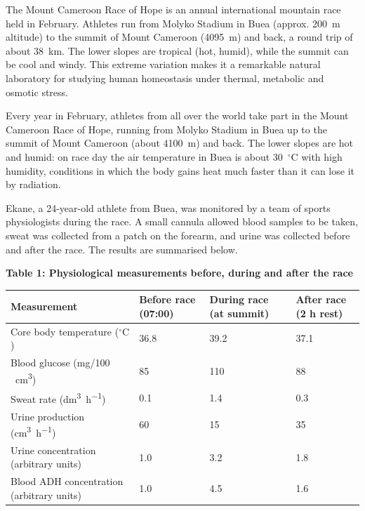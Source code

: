 \documentclass[11pt]{article}
\newcommand{\cle}[1]{{\popxbold\color{popdark}#1}}
\newcounter{popsec}
\newcounter{popsub}
\newcommand{\courssub}[1]{%
  \stepcounter{popsub}%
  \par\vspace{9pt}\noindent{\popxbold\fontsize{11.5}{13}\selectfont\color{popink}{\color{poporange}\thepopsec.\thepopsub}\hspace{6pt}#1}\par\nopagebreak\vspace{4pt}
}
\begin{document}
\begin{savaistu}
The \cle{Mount Cameroon Race of Hope} is an annual international mountain race held in February. Athletes run from Molyko Stadium in Buea (approx. \SI{200}{m} altitude) to the summit of Mount Cameroon (\SI{4095}{m}) and back, a round trip of about \SI{38}{km}. The lower slopes are tropical (hot, humid), while the summit can be cool and windy. This extreme variation makes it a remarkable natural laboratory for studying human homeostasis under thermal, metabolic and osmotic stress.
\end{savaistu}

\courssub{Situation}

\begin{experience}
Every year in February, athletes from all over the world take part in the \cle{Mount Cameroon Race of Hope}, running from Molyko Stadium in Buea up to the summit of Mount Cameroon (about \SI{4100}{m}) and back. The lower slopes are hot and humid: on race day the air temperature in Buea is about \SI{30}{\ensuremath{{}^{\circ}\mathrm{C}}} with high humidity, conditions in which the body gains heat much faster than it can lose it by radiation.

Ekane, a 24-year-old athlete from Buea, was monitored by a team of sports physiologists during the race. A small cannula allowed blood samples to be taken, sweat was collected from a patch on the forearm, and urine was collected before and after the race. The results are summarised below.

\textbf{Table 1: Physiological measurements before, during and after the race}

\begin{center}
\begin{tabularx}{\linewidth}{|l|X|X|X|}
\hline
\rowcolor{popblueL} \textbf{Measurement} & \textbf{Before race (07:00)} & \textbf{During race (at summit)} & \textbf{After race (2 h rest)} \\
\hline
Core body temperature (\si{\ensuremath{{}^{\circ}\mathrm{C}}}) & 36.8 & 39.2 & 37.1 \\
\hline
Blood glucose (\si{mg/100\,cm^{3}}) & 85 & 110 & 88 \\
\hline
Sweat rate (\si{dm^{3}.h^{-1}}) & 0.1 & 1.4 & 0.3 \\
\hline
Urine production (\si{cm^{3}.h^{-1}}) & 60 & 15 & 35 \\
\hline
Urine concentration (arbitrary units) & 1.0 & 3.2 & 1.8 \\
\hline
Blood ADH concentration (arbitrary units) & 1.0 & 4.5 & 1.6 \\
\hline
\end{tabularx}
\end{center}


\end{experience}
\end{document}
